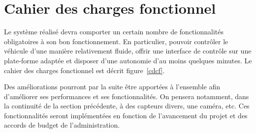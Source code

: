 \documentclass[a4paper,12pt]{report}
\begin{document}
	\section{Cahier des charges fonctionnel}
	Le système réalisé devra comporter un certain nombre de fonctionnalités obligatoires à son bon fonctionnement. En particulier, pouvoir contrôler le véhicule d’une manière relativement fluide, offrir une interface de contrôle sur une plate-forme adaptée et disposer d’une autonomie d’au moins quelques minutes. Le cahier des charges fonctionnel est décrit figure~\ref{cdcf}.

Des améliorations pourront par la suite être apportées à l’ensemble afin d’améliorer ses performances et ses fonctionnalités. On pensera notamment, dans la continuité de la section précédente, à des capteurs divers, une caméra, etc. Ces fonctionnalités seront implémentées en fonction de l’avancement du projet et des accords de budget de l’administration.
\end{document}
